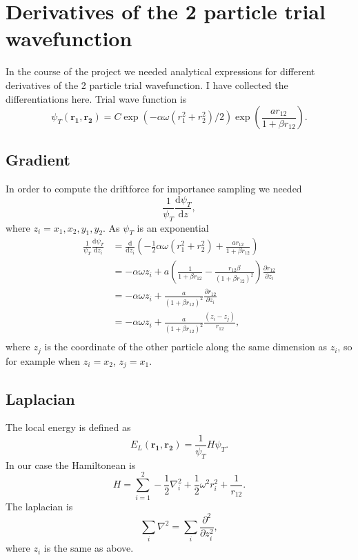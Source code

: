 \documentclass[a4paper,norsk,10pt]{article}
\newcommand{\bb}[1]{\boldsymbol{#1}}
\newcommand{\p}{\partial}
\newcommand{\dd}{\mathrm{d}}
\newcommand{\ddt}[2]{\frac{\dd #1}{\dd #2}}
\newcommand{\pddt}[2]{\frac{\p #1}{\p #2}}
\newcommand{\pndt}[3]{\frac{\p^{#3} #1}{\p #2^{#3}}}
\newcommand{\f}{\frac}
\begin{document}
\appendix
\section{Derivatives of the 2 particle trial wavefunction}
In the course of the project we needed analytical expressions for different derivatives of the 2 particle trial wavefunction. I have collected
the differentiations here.
Trial wave function is
\[\psi_T(\bb{r_1},\bb{r_2}) = C\exp\left(-\alpha\omega(r_1^2+r_2^2)/2\right)\exp\left(\f{ar_{12}}{1+\beta r_{12}}\right).\]

\subsection{Gradient}
In order to compute the driftforce for importance sampling we needed
\[\f{1}{\psi_T}\ddt{\psi_T}{z},\]
where \(z_i = x_1,x_2,y_1,y_2\).
As \(\psi_T\) is an exponential
\begin{align*}
  \f{1}{\psi_T}\ddt{\psi_T}{z_i} &= \ddt{}{z_i}\left(-\f{1}{2}\alpha\omega(r_1^2+r_2^2) + \f{ar_{12}}{1+\beta r_{12}}\right)\\
  &= -\alpha\omega z_i + a\left(\f{1}{1+\beta r_{12}} - \f{r_{12}\beta}{(1+\beta r_{12})^2}\right)\pddt{r_{12}}{z_i}\\
  &= -\alpha\omega z_i + \f{a}{(1+\beta r_{12})^2}\pddt{r_{12}}{z_i}\\
  &= -\alpha\omega z_i + \f{a}{(1+\beta r_{12})^2}\f{(z_i-z_j)}{r_{12}},\\
\end{align*}
where \(z_j\) is the coordinate of the other particle along the same dimension as \(z_i\), so for example when
\(z_i=x_2\), \(z_j = x_1\).

\subsection{Laplacian}\label{applap}

The local energy is defined as
\[E_L(\bb{r_1},\bb{r_2}) = \f{1}{\psi_T}H\psi_T.\]
In our case the Hamiltonean is
\[H = \sum_{i=1}^2-\f{1}{2}\nabla_i^2+\f{1}{2}\omega^2r_i^2 + \f{1}{r_{12}}.\]
The laplacian is
\[\sum_i\nabla^2 = \sum_i\pndt{}{z_i}{2},\]
where \(z_i\) is the same as above.
\end{document}
